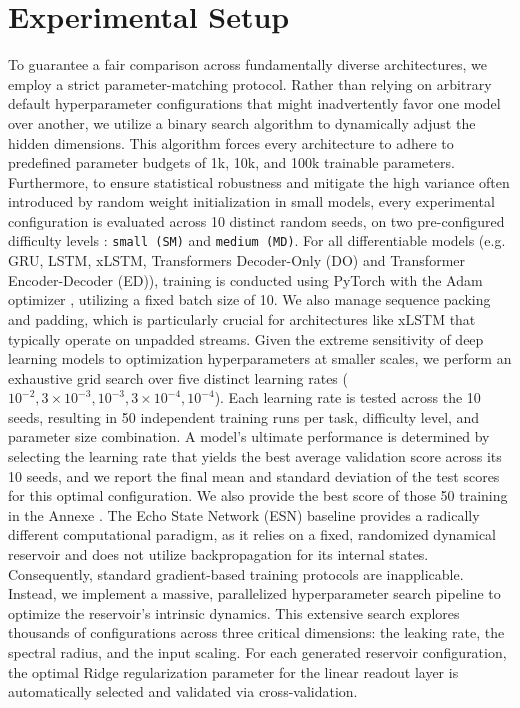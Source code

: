 \documentclass{article}
\begin{document}
\section{Experimental Setup}

To guarantee a fair comparison across fundamentally diverse architectures, we employ a strict parameter-matching protocol. Rather than relying on arbitrary default hyperparameter configurations that might inadvertently favor one model over another, we utilize a binary search algorithm to dynamically adjust the hidden dimensions. This algorithm forces every architecture to adhere to predefined parameter budgets of 1k, 10k, and 100k trainable parameters. Furthermore, to ensure statistical robustness and mitigate the high variance often introduced by random weight initialization in small models, every experimental configuration is evaluated across 10 distinct random seeds, on two pre-configured difficulty levels : \texttt{small (SM)} and \texttt{medium (MD)}. 
For all differentiable models (e.g. GRU, LSTM, xLSTM, Transformers Decoder-Only (DO) and Transformer Encoder-Decoder (ED)), training is conducted using PyTorch \cite{paszke2019pytorch} with the Adam optimizer \cite{kingma2014adam}, utilizing a fixed batch size of 10. We also manage sequence packing and padding, which is particularly crucial for architectures like xLSTM that typically operate on unpadded streams. Given the extreme sensitivity of deep learning models to optimization hyperparameters at smaller scales, we perform an exhaustive grid search over five distinct learning rates ($10^{-2}, 3 \times 10^{-3}, 10^{-3}, 3 \times 10^{-4}, 10^{-4}$). Each learning rate is tested across the 10 seeds, resulting in 50 independent training runs per task, difficulty level, and parameter size combination. A model's ultimate performance is determined by selecting the learning rate that yields the best average validation score across its 10 seeds, and we report the final mean and standard deviation of the test scores for this optimal configuration. We also provide the best score of those 50 training in the Annexe . 
The Echo State Network (ESN) baseline provides a radically different computational paradigm, as it relies on a fixed, randomized dynamical reservoir and does not utilize backpropagation for its internal states. Consequently, standard gradient-based training protocols are inapplicable. Instead, we implement a massive, parallelized hyperparameter search pipeline to optimize the reservoir's intrinsic dynamics. This extensive search explores thousands of configurations across three critical dimensions: the leaking rate, the spectral radius, and the input scaling. For each generated reservoir configuration, the optimal Ridge regularization parameter for the linear readout layer is automatically selected and validated via cross-validation.
\end{document}
